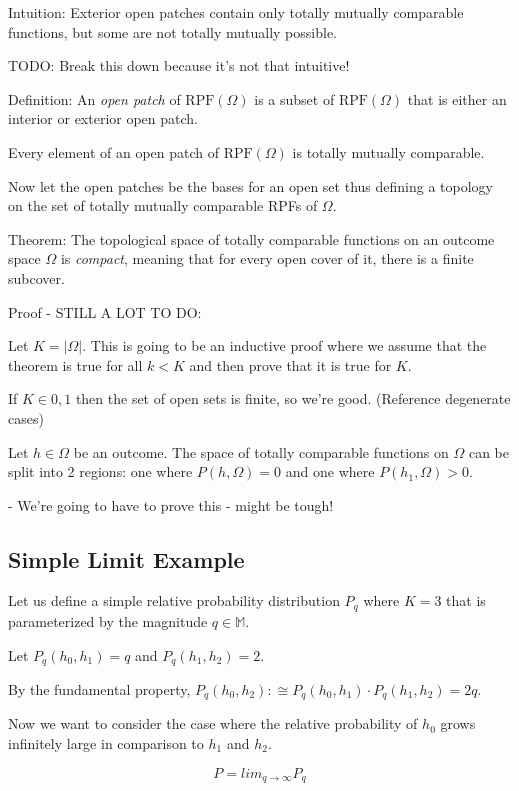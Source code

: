 \documentclass[twoside]{article}
\theoremstyle{plain}%
\theoremstyle{definition}
\theoremstyle{remark}
\begin{document}
Intuition: Exterior open patches contain only totally mutually comparable functions, but some are not totally mutually possible.

TODO: Break this down because it's not that intuitive!

Definition: An \textit{open patch} of \(\text{RPF}(\Omega)\) is a subset of \(\text{RPF}(\Omega)\) that is either an interior or exterior open patch.

Every element of an open patch of \(\text{RPF}(\Omega)\) is totally mutually comparable.

Now let the open patches be the bases for an open set thus defining a topology on the set of totally mutually comparable RPFs of \(\Omega\).

Theorem: The topological space of totally comparable functions on an outcome space \(\Omega\) is \textit{compact}, meaning that for every open cover of it, there is a finite subcover.

Proof - STILL A LOT TO DO:

Let \(K = |\Omega|\). This is going to be an inductive proof where we assume that the theorem is true for all \(k < K\) and then prove that it is true for \(K\).

If \(K \in {0, 1}\) then the set of open sets is finite, so we're good. (Reference degenerate cases)

Let \(h \in \Omega\) be an outcome. The space of totally comparable functions on \(\Omega\) can be split into 2 regions: one where \(P(h, \Omega) = 0\) and one where \(P(h_1, \Omega) > 0\).

- We're going to have to prove this - might be tough!

\subsection{Simple Limit Example}

Let us define a simple relative probability distribution \(P_q\) where \(K = 3\) that is parameterized by the magnitude \(q \in \mathbb{M}\).

Let \(P_q(h_0, h_1) = q\) and \(P_q(h_1, h_2) = 2\).

By the fundamental property, \(P_q(h_0, h_2) :\cong P_q(h_0, h_1) \cdot P_q(h_1, h_2) = 2q\).

Now we want to consider the case where the relative probability of \(h_0\) grows infinitely large in comparison to \(h_1\) and \(h_2\).

\[P = lim_{q \rightarrow \infty} P_q\]
\end{document}
